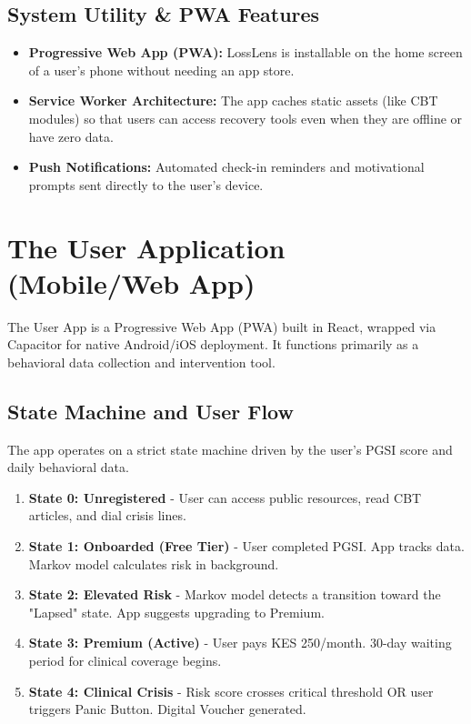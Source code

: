 \documentclass[11pt,a4paper]{article}
\begin{document}
\subsection{System Utility \& PWA Features}
\begin{itemize}
    \item \textbf{Progressive Web App (PWA):} LossLens is installable on the home screen of a user's phone without needing an app store.
    \item \textbf{Service Worker Architecture:} The app caches static assets (like CBT modules) so that users can access recovery tools even when they are offline or have zero data.
    \item \textbf{Push Notifications:} Automated check-in reminders and motivational prompts sent directly to the user's device.
\end{itemize}
\section{The User Application (Mobile/Web App)}
The User App is a Progressive Web App (PWA) built in React, wrapped via Capacitor for native Android/iOS deployment. It functions primarily as a behavioral data collection and intervention tool.

\subsection{State Machine and User Flow}
The app operates on a strict state machine driven by the user's PGSI score and daily behavioral data.
\begin{enumerate}
    \item \textbf{State 0: Unregistered} - User can access public resources, read CBT articles, and dial crisis lines.
    \item \textbf{State 1: Onboarded (Free Tier)} - User completed PGSI. App tracks data. Markov model calculates risk in background.
    \item \textbf{State 2: Elevated Risk} - Markov model detects a transition toward the "Lapsed" state. App suggests upgrading to Premium.
    \item \textbf{State 3: Premium (Active)} - User pays KES 250/month. 30-day waiting period for clinical coverage begins.
    \item \textbf{State 4: Clinical Crisis} - Risk score crosses critical threshold OR user triggers Panic Button. Digital Voucher generated.
\end{enumerate}
\end{document}
